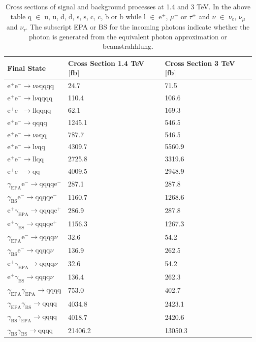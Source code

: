 \begin{table}[h!]
\centering
\begin{tabular}{ l l l}
\hline
Final State & Cross Section 1.4 TeV [fb] & Cross Section 3 TeV [fb]  \\ 
\hline
$\text{e}^{+}\text{e}^{-} \rightarrow \nu{\nu}\text{qqqq}$ & 24.7 & 71.5 \\
$\text{e}^{+}\text{e}^{-} \rightarrow \text{l}\nu\text{qqqq}$ & 110.4 & 106.6 \\
$\text{e}^{+}\text{e}^{-} \rightarrow \text{llqqqq}$ & 62.1 & 169.3 \\
$\text{e}^{+}\text{e}^{-} \rightarrow \text{qqqq}$ & 1245.1 & 546.5 \\
$\text{e}^{+}\text{e}^{-} \rightarrow \nu{\nu}\text{qq}$ & 787.7 & 546.5 \\
$\text{e}^{+}\text{e}^{-} \rightarrow \text{l}\nu\text{qq}$ & 4309.7 & 5560.9 \\
$\text{e}^{+}\text{e}^{-} \rightarrow \text{llqq}$ & 2725.8 & 3319.6 \\
$\text{e}^{+}\text{e}^{-} \rightarrow \text{qq}$ & 4009.5 & 2948.9 \\
$\gamma_{\text{EPA}}\text{e}^{-} \rightarrow \text{qqqq}\text{e}^{-}$ & 287.1 & 287.8 \\
$\gamma_{\text{BS}}\text{e}^{-} \rightarrow \text{qqqq}\text{e}^{-}$ & 1160.7 & 1268.6 \\
$\text{e}^{+}\gamma_{\text{EPA}} \rightarrow \text{qqqq}\text{e}^{+}$ & 286.9 & 287.8 \\
$\text{e}^{+}\gamma_{\text{BS}} \rightarrow \text{qqqq}\text{e}^{+}$ & 1156.3 & 1267.3 \\
$\gamma_{\text{EPA}}\text{e}^{-} \rightarrow \text{qqqq}\nu$ & 32.6 & 54.2 \\
$\gamma_{\text{BS}}\text{e}^{-} \rightarrow \text{qqqq}\nu$ & 136.9 & 262.5 \\
$\text{e}^{+}\gamma_{\text{EPA}} \rightarrow \text{qqqq}\nu$ & 32.6 & 54.2 \\
$\text{e}^{+}\gamma_{\text{BS}} \rightarrow \text{qqqq}\nu$ & 136.4 & 262.3 \\
$\gamma_{\text{EPA}}\gamma_{\text{EPA}} \rightarrow \text{qqqq}$ & 753.0 & 402.7 \\
$\gamma_{\text{EPA}}\gamma_{\text{BS}} \rightarrow \text{qqqq}$ & 4034.8 & 2423.1 \\
$\gamma_{\text{BS}}\gamma_{\text{EPA}} \rightarrow \text{qqqq}$ & 4018.7 & 2420.6 \\
$\gamma_{\text{BS}}\gamma_{\text{BS}} \rightarrow \text{qqqq}$ & 21406.2 & 13050.3 \\
\hline
\end{tabular}
\caption[]{Cross sections of signal and background processes at 1.4 and 3 TeV. In the above table q $\in$ u, $\bar{\text{u}}$, d, $\bar{\text{d}}$, s, $\bar{\text{s}}$, c, $\bar{\text{c}}$, b or $\bar{\text{b}}$ while l $\in$ $\text{e}^{\pm}$, $\mu^{\pm}$ or $\tau^{\pm}$ and $\nu$ $\in$ $\nu_{e}$, $\nu_{\mu}$ and $\nu_{\tau}$.  The subscript EPA or BS for the incoming photons indicate whether the photon is generated from the equivalent photon approximation or beamstrahhlung.}
\label{table:crosssectionfull}
\end{table}

